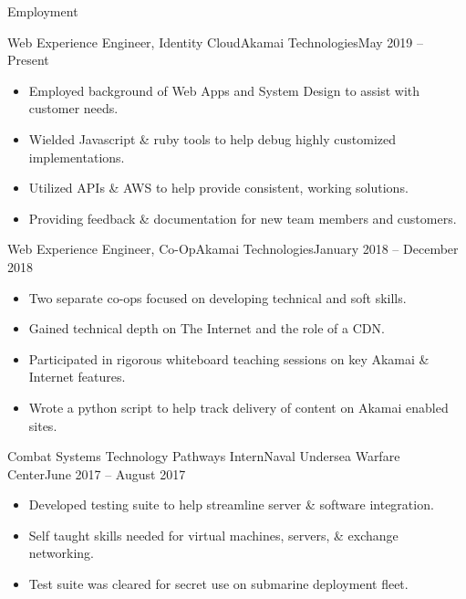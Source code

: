 \documentclass[]{mcdowellcv}
\begin{document}
	\makeheader
	
	\begin{cvsection}{Employment}
		\begin{cvsubsection}{Web Experience Engineer, Identity Cloud}{Akamai Technologies}{May 2019 -- Present}
		\vspace{2mm}
			\begin{itemize}
				\item Employed background of Web Apps and System Design to assist with customer needs.
				\item Wielded Javascript \& ruby tools to help debug highly customized implementations.
				\item Utilized APIs \& AWS to help provide consistent, working solutions.
				\item Providing feedback \& documentation for new team members and customers.
			\end{itemize}
		\end{cvsubsection}
		
		\begin{cvsubsection}{Web Experience Engineer, Co-Op}{Akamai Technologies}{January 2018 -- December 2018}
		\vspace{2mm}
			\begin{itemize}
				\item Two separate co-ops focused on developing technical and soft skills.
				\item Gained technical depth on The Internet and the role of a CDN.
				\item Participated in rigorous whiteboard teaching sessions on key Akamai \& Internet features.
				\item Wrote a python script to help track delivery of content on Akamai enabled sites.
			\end{itemize}
		\end{cvsubsection}
		
		\begin{cvsubsection}{Combat Systems Technology Pathways Intern}{Naval Undersea Warfare Center}{June 2017 -- August 2017}
		\vspace{2mm}
			\begin{itemize}
				\item Developed testing suite to help streamline server \& software integration.
				\item Self taught skills needed for virtual machines, servers, \& exchange networking.
				\item Test suite was cleared for secret use on submarine deployment fleet.
			\end{itemize}
		\end{cvsubsection}
		
	\end{cvsection}
	
\end{document}
